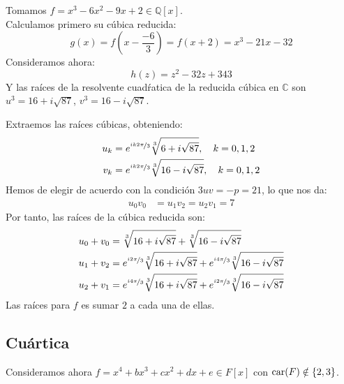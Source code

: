 \begin{ejemplo}
    Tomamos $f = x^3-6x^2-9x+2\in \mathbb{Q}[x]$.\\

    \noindent
    Calculamos primero su cúbica reducida:
    \begin{equation*}
        g(x) = f\left(x-\frac{-6}{3}\right) = f(x+2) = x^3-21x-32
    \end{equation*}
    Consideramos ahora:
    \begin{equation*}
        h(z) = z^2 - 32z +343
    \end{equation*}
    Y las raíces de la resolvente cuadŕatica de la reducida cúbica en $\mathbb{C}$ son $u^3 = 16 + i\sqrt{87}$, $v^3 = 16-i\sqrt{87}$.

    \noindent
    Extraemos las raíces cúbicas, obteniendo:
    \begin{align*}
        u_k &= e^{\nicefrac{ik2\pi}{3}}\sqrt[3]{6+i\sqrt{87}}, \quad k = 0,1,2 \\
        v_k &= e^{\nicefrac{ik2\pi}{3}}\sqrt[3]{16-i\sqrt{87}}, \quad k = 0,1,2
    \end{align*}
    Hemos de elegir de acuerdo con la condición $3uv = -p = 21$, lo que nos da:
    \begin{align*}
        u_0v_0 &= u_1v_2 = u_2v_1 = 7
    \end{align*}
    Por tanto, las raíces de la cúbica reducida son:
    \begin{align*}
        u_0+v_0 &= \sqrt[3]{16 + i\sqrt{87}} + \sqrt[3]{16-i\sqrt{87}} \\
        u_1+v_2 &= e^{\nicefrac{i2\pi}{3}} \sqrt[3]{16+i\sqrt{87}} + e^{\nicefrac{i4\pi}{3}} \sqrt[3]{16-i\sqrt{87}} \\
        u_2+v_1 &= e^{\nicefrac{i4\pi}{3}}\sqrt[3]{16+i\sqrt{87}} + e^{\nicefrac{i2\pi}{3}}\sqrt[3]{16-i\sqrt{87}}
    \end{align*}
    Las raíces para $f$ es sumar $2$ a cada una de ellas.
\end{ejemplo}

\subsection{Cuártica}
\noindent
Consideramos ahora $f=x^4+bx^3+cx^2+dx + e \in F[x]$ con $\operatorname{car}(F) \notin \{2,3\}$.

